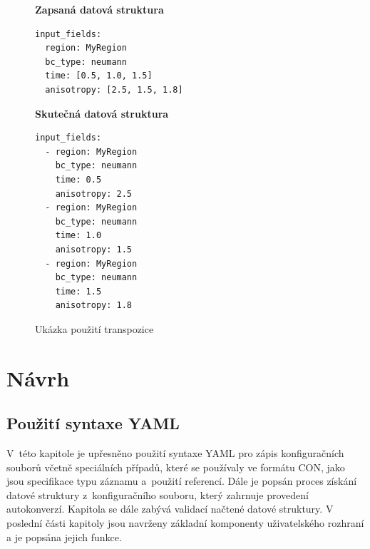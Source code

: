 \documentclass[FM,bw,DP]{tulthesis}
\begin{document}
\begin{figure}[ht]
\singlespacing
\begin{minipage}[t]{0.5\linewidth}
\vspace{0pt}
\textbf{Zapsaná datová struktura}\\
\vspace{-5pt}
\begin{lstlisting}
input_fields: 
  region: MyRegion
  bc_type: neumann
  time: [0.5, 1.0, 1.5]
  anisotropy: [2.5, 1.5, 1.8]
\end{lstlisting}
\end{minipage}
\hfill
\begin{minipage}[t]{0.45\linewidth}
\vspace{0pt}
\textbf{Skutečná datová struktura}\\
\vspace{-5pt}
\begin{lstlisting}
input_fields: 
  - region: MyRegion
    bc_type: neumann
    time: 0.5
    anisotropy: 2.5
  - region: MyRegion
    bc_type: neumann
    time: 1.0
    anisotropy: 1.5
  - region: MyRegion
    bc_type: neumann
    time: 1.5
    anisotropy: 1.8
\end{lstlisting}
\vspace*{-20pt}
\end{minipage}
\onehalfspacing
\caption{Ukázka použití transpozice}
\label{img:transposition_code_example}
\end{figure}

\chapter{Návrh}


\section{Použití syntaxe YAML}
V~této kapitole je upřesněno použití syntaxe \gls{YAML} pro zápis konfiguračních souborů včetně speciálních případů, které se používaly ve formátu \gls{CON}, jako jsou specifikace typu záznamu a~použití referencí. Dále je popsán proces získání datové struktury z~konfiguračního souboru, který zahrnuje provedení autokonverzí. Kapitola se dále zabývá validací načtené datové struktury. V poslední části kapitoly jsou navrženy základní komponenty uživatelského rozhraní a je popsána jejich funkce.

\end{document}
